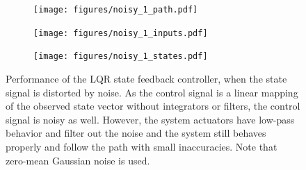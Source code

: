 \begin{figure}[h]
	\centering
	\begin{minipage}{0.4\textwidth}
		\begin{subfigure}{\textwidth}
				\texttt{[image: figures/noisy\_1\_path.pdf]}
		\end{subfigure}
		\begin{subfigure}{\textwidth}
				\texttt{[image: figures/noisy\_1\_inputs.pdf]}
		\end{subfigure}
	\end{minipage}
	\begin{subfigure}{.59\textwidth}
		\texttt{[image: figures/noisy\_1\_states.pdf]}
	\end{subfigure}
	\caption{Performance of the LQR state feedback controller, when the state signal is distorted by noise. As the control signal is a linear mapping of the observed state vector without integrators or filters, the control signal is noisy as well. However, the system actuators have low-pass behavior and filter out the noise and the system still behaves properly and follow the path with small inaccuracies. Note that zero-mean Gaussian noise is used.}
	\label{fig:noisy_states}
\end{figure}

